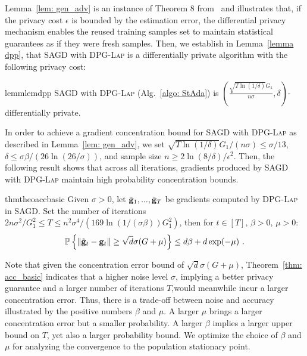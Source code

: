 \documentclass[11pt]{article}
\begin{document}
Lemma~\ref{lem: gen_adv} is an instance of Theorem 8 from~\cite{Proc:Dwork_NIPS15} and illustrates that, if the privacy cost $\epsilon$ is bounded by the estimation error, the differential privacy mechanism enables the reused training samples set to maintain statistical guarantees as if they were fresh samples. 
Then, we establish in Lemma~\ref{lemma dpp}, that \textsc{SAGD} with \textsc{DPG-Lap} is a differentially private algorithm with the following privacy cost:
\begin{restatable}{lemm}{lemdpp}
\label{lemma dpp}
\textsc{SAGD} with \textsc{DPG-Lap} (Alg.~\ref{algo: StAda}) is $(\frac{\sqrt{T \ln(1/\delta)} G_1}{n\sigma}, \delta)$-differentially private. 
\end{restatable}  
In order to achieve a gradient concentration bound for \textsc{SAGD} with \textsc{DPG-Lap} as described in Lemma~\ref{lem: gen_adv}, we set $\sqrt{T \ln(1/\delta)} G_1/(n\sigma)\leq \sigma/13$, $\delta \leq \sigma \beta/(26 \ln(26/\sigma))$, and  sample size $n \geq 2\ln(8/\delta)/\epsilon^2$. 
Then, the following result shows that across all iterations, gradients produced by \textsc{SAGD} with \textsc{DPG-Lap} maintain high probability concentration bounds.

\begin{restatable}{thm}{theoaccbasic}
\label{thm: acc_basic}
Given $\sigma > 0$, let $\tilde {\mathbf{g}}_1,...,  \tilde {\mathbf{g}}_T$ be gradients computed by \textsc{DPG-Lap} in \textsc{SAGD}. Set the number of iterations $ 2n\sigma^2/G_1^2\leq T \leq n^2 \sigma^4/(169 \ln(1/(\sigma \beta))G_1^2)$, then for $t \in [T]$, $\beta >0$, $\mu > 0$:
    \begin{equation*}
    \mathbb{P}\left\{\|\tilde {\mathbf{g}}_t - \mathbf{g}_t\| \geq \sqrt{d}\sigma(G +\mu)\right\} \leq d\beta + d\exp(-\mu)~.
    \end{equation*}
\end{restatable}
Note that given the concentration error bound of $\sqrt{d}\sigma(G +\mu)$, Theorem~\ref{thm: acc_basic} indicates that a higher noise level $\sigma$, implying a better privacy guarantee and a larger number of iterations $T$,would meanwhile incur a larger concentration error.
Thus, there is a trade-off between noise and accuracy illustrated by the positive numbers $\beta$ and $\mu$.
A larger $\mu$ brings a larger concentration error but a smaller probability. 
A larger $\beta$ implies a larger upper bound on $T$, yet also a larger probability bound. We
optimize the choice of $\beta$ and $\mu$ for analyzing the
convergence to the population stationary point.
\end{document}
